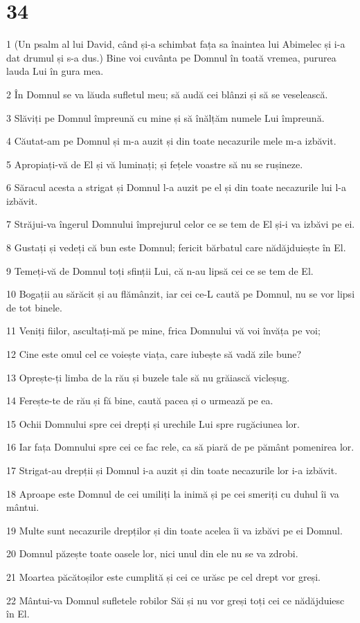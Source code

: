 \chapter{34}

\par 1 (Un psalm al lui David, când și-a schimbat fața sa înaintea lui Abimelec și i-a dat drumul și s-a dus.) Bine voi cuvânta pe Domnul în toată vremea, pururea lauda Lui în gura mea.
\par 2 În Domnul se va lăuda sufletul meu; să audă cei blânzi și să se veselească.
\par 3 Slăviți pe Domnul împreună cu mine și să înălțăm numele Lui împreună.
\par 4 Căutat-am pe Domnul și m-a auzit și din toate necazurile mele m-a izbăvit.
\par 5 Apropiați-vă de El și vă luminați; și fețele voastre să nu se rușineze.
\par 6 Săracul acesta a strigat și Domnul l-a auzit pe el și din toate necazurile lui l-a izbăvit.
\par 7 Străjui-va îngerul Domnului împrejurul celor ce se tem de El și-i va izbăvi pe ei.
\par 8 Gustați și vedeți că bun este Domnul; fericit bărbatul care nădăjduiește în El.
\par 9 Temeți-vă de Domnul toți sfinții Lui, că n-au lipsă cei ce se tem de El.
\par 10 Bogații au sărăcit și au flămânzit, iar cei ce-L caută pe Domnul, nu se vor lipsi de tot binele.
\par 11 Veniți fiilor, ascultați-mă pe mine, frica Domnului vă voi învăța pe voi;
\par 12 Cine este omul cel ce voiește viața, care iubește să vadă zile bune?
\par 13 Oprește-ți limba de la rău și buzele tale să nu grăiască vicleșug.
\par 14 Ferește-te de rău și fă bine, caută pacea și o urmează pe ea.
\par 15 Ochii Domnului spre cei drepți și urechile Lui spre rugăciunea lor.
\par 16 Iar fața Domnului spre cei ce fac rele, ca să piară de pe pământ pomenirea lor.
\par 17 Strigat-au drepții și Domnul i-a auzit și din toate necazurile lor i-a izbăvit.
\par 18 Aproape este Domnul de cei umiliți la inimă și pe cei smeriți cu duhul îi va mântui.
\par 19 Multe sunt necazurile drepților și din toate acelea îi va izbăvi pe ei Domnul.
\par 20 Domnul păzește toate oasele lor, nici unul din ele nu se va zdrobi.
\par 21 Moartea păcătoșilor este cumplită și cei ce urăsc pe cel drept vor greși.
\par 22 Mântui-va Domnul sufletele robilor Săi și nu vor greși toți cei ce nădăjduiesc în El.

